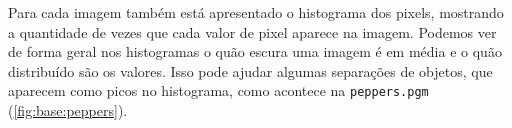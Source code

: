 Para cada imagem também está apresentado o histograma dos pixels, mostrando a quantidade de vezes que cada valor de pixel aparece na imagem. Podemos ver de forma geral nos histogramas o quão escura uma imagem é em média e o quão distribuído são os valores. Isso pode ajudar algumas separações de objetos, que aparecem como picos no histograma, como acontece na \texttt{peppers.pgm} (\cref{fig:base:peppers}).








\endgroup

